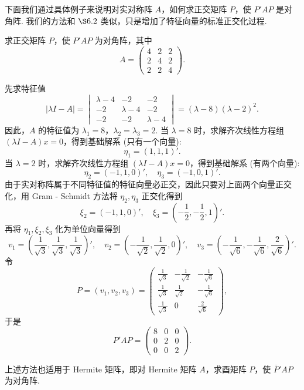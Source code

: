\documentclass[../../main.tex]{subfiles}
\begin{document}
\vspace{0.5cm}

下面我们通过具体例子来说明对实对称阵 $A$，如何求正交矩阵 $P$，使 $P'AP$ 是对角阵. 我们的方法和 $\S 6.2$ 类似，只是增加了特征向量的标准正交化过程.
\begin{example}
求正交矩阵 $P$，使 $P'AP$ 为对角阵，其中
\[
A = \begin{pmatrix}
4 & 2 & 2 \\
2 & 4 & 2 \\
2 & 2 & 4
\end{pmatrix}.
\]
\end{example}
\begin{solution}
先求特征值
\[
|\lambda I - A| = 
\begin{vmatrix}
\lambda - 4 & -2 & -2 \\
-2 & \lambda - 4 & -2 \\
-2 & -2 & \lambda - 4
\end{vmatrix}
= (\lambda - 8)(\lambda - 2)^2.
\]
因此，$A$ 的特征值为 $\lambda_1 = 8$，$\lambda_2 = \lambda_3 = 2$. 当 $\lambda = 8$ 时，求解齐次线性方程组 $(\lambda I - A)x = 0$，得到基础解系 (只有一个向量):
\[
\eta_1 = (1,1,1)'.
\]
当 $\lambda = 2$ 时，求解齐次线性方程组 $(\lambda I - A)x = 0$，得到基础解系 (有两个向量):
\[
\eta_2 = (-1,1,0)', \quad \eta_3 = (-1,0,1)'.
\]
由于实对称阵属于不同特征值的特征向量必正交，因此只要对上面两个向量正交化，用 Gram - Schmidt 方法将 $\eta_2,\eta_3$ 正交化得到
\[
\xi_2 = (-1,1,0)', \quad \xi_3 = (-\frac{1}{2},-\frac{1}{2},1)'.
\]
再将 $\eta_1,\xi_2,\xi_3$ 化为单位向量得到
\[
v_1 = (\frac{1}{\sqrt{3}},\frac{1}{\sqrt{3}},\frac{1}{\sqrt{3}})', \quad 
v_2 = (-\frac{1}{\sqrt{2}},\frac{1}{\sqrt{2}},0)', \quad 
v_3 = (-\frac{1}{\sqrt{6}},-\frac{1}{\sqrt{6}},\frac{2}{\sqrt{6}})'.
\]
令
\[
P = (v_1,v_2,v_3) = 
\begin{pmatrix}
\frac{1}{\sqrt{3}} & -\frac{1}{\sqrt{2}} & -\frac{1}{\sqrt{6}} \\
\frac{1}{\sqrt{3}} & \frac{1}{\sqrt{2}} & -\frac{1}{\sqrt{6}} \\
\frac{1}{\sqrt{3}} & 0 & \frac{2}{\sqrt{6}}
\end{pmatrix},
\]
于是
\[
P'AP = 
\begin{pmatrix}
8 & 0 & 0 \\
0 & 2 & 0 \\
0 & 0 & 2
\end{pmatrix}.
\]
\end{solution}
\begin{remark}
上述方法也适用于 Hermite 矩阵，即对 Hermite 矩阵 $A$，求酉矩阵 $P$，使 $\overline{P}'AP$ 为对角阵.
\end{remark}
\end{document}
